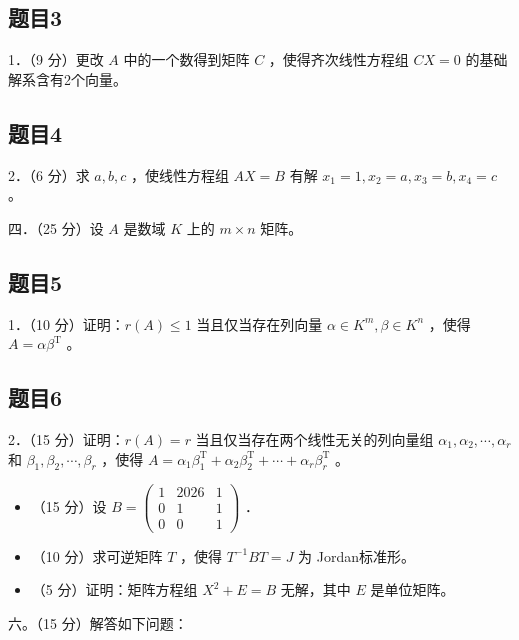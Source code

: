\documentclass{article}
\begin{document}
\subsection{题目3}
1．（9 分）更改 \(A\) 中的一个数得到矩阵 \(C\) ，使得齐次线性方程组 \(C X=0\) 的基础解系含有2个向量。\\

\subsection{题目4}
2．（6 分）求 \(a, b, c\) ，使线性方程组 \(A X=B\) 有解 \(x_{1}=1, x_{2}=a, x_{3}=b, x_{4}=c\) 。

四．（25 分）设 \(A\) 是数域 \(K\) 上的 \(m \times n\) 矩阵。\\

\subsection{题目5}
1．（10 分）证明：\(r(A) \leq 1\) 当且仅当存在列向量 \(\alpha \in K^{m}, \beta \in K^{n}\) ，使得 \(A=\alpha \beta^{\mathrm{T}}\) 。\\

\subsection{题目6}
2．（15 分）证明：\(r(A)=r\) 当且仅当存在两个线性无关的列向量组 \(\alpha_{1}, \alpha_{2}, \cdots, \alpha_{r}\) 和 \(\beta_{1}, \beta_{2}, \cdots, \beta_{r}\) ，使得 \(A=\alpha_{1} \beta_{1}^{\mathrm{T}}+\alpha_{2} \beta_{2}^{\mathrm{T}}+\cdots+\alpha_{r} \beta_{r}^{\mathrm{T}}\) 。

\begin{itemize}
  \item[五．] （15 分）设 \(B=\left(\begin{array}{ccc}1 & 2026 & 1 \\ 0 & 1 & 1 \\ 0 & 0 & 1\end{array}\right)\) ．

  \item[1．] （10 分）求可逆矩阵 \(T\) ，使得 \(T^{-1} B T=J\) 为 Jordan标准形。

  \item[2．] （5 分）证明：矩阵方程组 \(X^{2}+E=B\) 无解，其中 \(E\) 是单位矩阵。
\end{itemize}

六。（15 分）解答如下问题：
\end{document}
